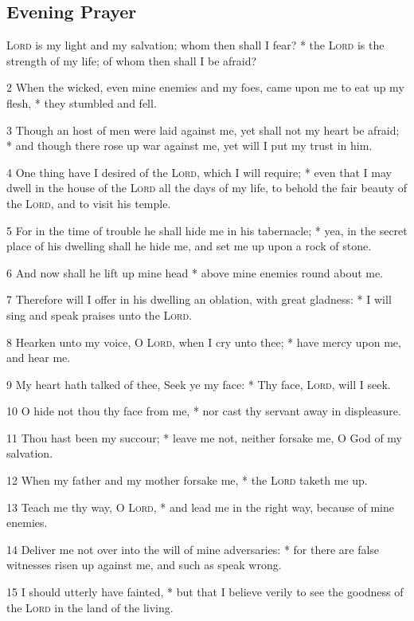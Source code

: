 \subsection{Evening Prayer}
 {\textsc{Lord}} is my light and my salvation; whom then shall I fear? * the {\textsc{Lord}} is the strength of my life; of whom then shall I be afraid?\par
2 When the wicked, even mine enemies and my foes, came upon me to eat up my flesh, * they stumbled and fell.\par
3 Though an host of men were laid against me, yet shall not my heart be afraid; * and though there rose up war against me, yet will I put my trust in him.\par
4 One thing have I desired of the {\textsc{Lord}}, which I will require; * even that I may dwell in the house of the {\textsc{Lord}} all the days of my life, to behold the fair beauty of the {\textsc{Lord}}, and to visit his temple.\par
5 For in the time of trouble he shall hide me in his tabernacle; * yea, in the secret place of his dwelling shall he hide me, and set me up upon a rock of stone.\par
6 And now shall he lift up mine head * above mine enemies round about me.\par
7 Therefore will I offer in his dwelling an oblation, with great gladness: * I will sing and speak praises unto the {\textsc{Lord}}.\par
8 Hearken unto my voice, O {\textsc{Lord}}, when I cry unto thee; * have mercy upon me, and hear me.\par
9 My heart hath talked of thee, Seek ye my face: * Thy face, {\textsc{Lord}}, will I seek.\par
10 O hide not thou thy face from me, * nor cast thy servant away in displeasure.\par
11 Thou hast been my succour; * leave me not, neither forsake me, O God of my salvation.\par
12 When my father and my mother forsake me, * the {\textsc{Lord}} taketh me up.\par
13 Teach me thy way, O {\textsc{Lord}}, * and lead me in the right way, because of mine enemies.\par
14 Deliver me not over into the will of mine adversaries: * for there are false witnesses risen up against me, and such as speak wrong.\par
15 I should utterly have fainted, * but that I believe verily to see the goodness of the {\textsc{Lord}} in the land of the living.\par
